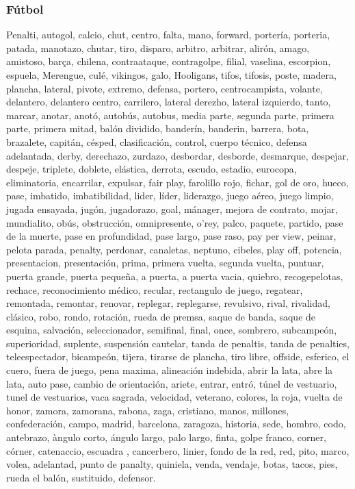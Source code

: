 \documentclass[../all.tex]{subfiles}
\begin{document}
    \subsubsection{Fútbol}
    Penalti, autogol, calcio, chut, centro, falta, mano, forward, portería, porteria, patada, manotazo, chutar, tiro, disparo, arbitro, arbitrar, alirón, amago, amistoso, barça, chilena, contraataque, contragolpe, filial, vaselina, escorpion, espuela, Merengue, culé, vikingos, galo, Hooligans, tifos, tifosis, poste, madera, plancha, lateral, pivote, extremo, defensa, portero, centrocampista, volante, delantero, delantero centro, carrilero, lateral derezho, lateral izquierdo, tanto, marcar, anotar, anotó, autobús, autobus, media parte, segunda parte, primera parte, primera mitad, balón dividido, banderín, banderin, barrera, bota, brazalete, capitán, césped, clasificación, control, cuerpo técnico, defensa adelantada, derby, derechazo, zurdazo, desbordar, desborde, desmarque, despejar, despeje, triplete, doblete, elástica, derrota, escudo, estadio, eurocopa, eliminatoria, encarrilar, expulsar, fair play, farolillo rojo, fichar, gol de oro, hueco, pase, imbatido, imbatibilidad, lider, líder, liderazgo, juego aéreo, juego limpio, jugada ensayada, jugón, jugadorazo, goal, mánager, mejora de contrato, mojar, mundialito, obús, obstrucción, omnipresente, o'rey, palco, paquete, partido, pase de la muerte, pase en profundidad, pase largo, pase raso, pay per view, peinar, pelota parada, penalty, perdonar, canaletas, neptuno, cibeles, play off, potencia, presentacion, presentación, prima, primera vuelta, segunda vuelta, puntuar, puerta grande, puerta pequeña, a puerta, a puerta vacia, quiebro, recogepelotas, rechace, reconocimiento médico, recular, rectangulo de juego, regatear, remontada, remontar, renovar, replegar, replegarse, revulsivo, rival, rivalidad, clásico, robo, rondo, rotación, rueda de premsa, saque de banda, saque de esquina, salvación, seleccionador, semifinal, final, once, sombrero, subcampeón, superioridad, suplente, suspensión cautelar, tanda de penaltis, tanda de penalties, teleespectador, bicampeón, tijera, tirarse de plancha, tiro libre, offside, esferico, el cuero, fuera de juego, pena maxima, alineación indebida, abrir la lata, abre la lata, auto pase, cambio de orientación, ariete, entrar, entró, túnel de vestuario, tunel de vestuarios, vaca sagrada, velocidad, veterano, colores, la roja, vuelta de honor, zamora, zamorana, rabona, zaga, cristiano, manos, millones, confederación, campo, madrid, barcelona, zaragoza, historia, sede, hombro, codo, antebrazo, àngulo corto, ángulo largo, palo largo, finta, golpe franco, corner, córner, catenaccio, escuadra
, cancerbero, linier, fondo de la red, red, pito, marco, volea, adelantad, punto de panalty, quiniela, venda, vendaje, botas, tacos, pies, rueda el balón, sustituido, defensor.
\end{document}
